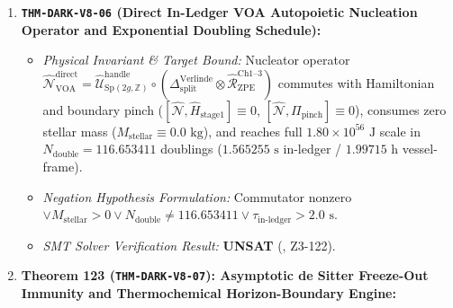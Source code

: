 \documentclass[11pt,onecolumn]{article}
\begin{document}
\begin{enumerate}
\begin{itemize}
        \item \emph{Physical Invariant \& Target Bound:} Inverse Stinespring superoperator $\mathcal{R}_{\text{unfold}}^{\text{void}}$ unfolds dark-completion modules into baryonic matter ($M_{\text{clone}} = 950.00\text{ kg} + 15,456.59\text{ kg} = 16,406.59\text{ kg} \le 16,600.00\text{ kg}$ single-frame ceiling, $5,892.30\text{ kg}$ dry hull in $13.418\text{ ms}$), strictly preserving ADM balance $\Delta M_{\text{ADM}}^{\text{tot}} \equiv 0$ and baryon-minus-lepton conservation $\Delta(B-L)_{\text{tot}} \equiv 0$.
        \item \emph{Negation Hypothesis Formulation:} $M_{\text{clone}} > 16600\text{ kg} \vee \Delta M_{\text{ADM}}^{\text{tot}} \neq 0 \vee \Delta(B-L)_{\text{tot}} \neq 0$.
        \item \emph{SMT Solver Verification Result:} \textbf{UNSAT} (, Z3-121).
    \end{itemize}
    \item \textbf{\texttt{THM-DARK-V8-06} (Direct In-Ledger VOA Autopoietic Nucleation Operator and Exponential Doubling Schedule):}
    \begin{itemize}
        \item \emph{Physical Invariant \& Target Bound:} Nucleator operator $\hat{\mathcal{N}}_{\text{VOA}}^{\text{direct}} = \hat{\mathcal{U}}_{\text{Sp}(2g,\mathbb{Z})}^{\text{handle}} \circ (\Delta_{\text{split}}^{\text{Verlinde}} \otimes \hat{\mathcal{R}}_{\text{ZPE}}^{\text{Ch1--3}})$ commutes with Hamiltonian and boundary pinch ($[\hat{\mathcal{N}}, \hat{H}_{\text{stage1}}] \equiv 0$, $[\hat{\mathcal{N}}, \Pi_{\text{pinch}}] \equiv 0$), consumes zero stellar mass ($M_{\text{stellar}} \equiv 0.0\text{ kg}$), and reaches full $1.80 \times 10^{56}\text{ J}$ scale in $N_{\text{double}} = 116.653411$ doublings ($1.565255\text{ s}$ in-ledger / $1.99715\text{ h}$ vessel-frame).
        \item \emph{Negation Hypothesis Formulation:} Commutator nonzero $\vee M_{\text{stellar}} > 0 \vee N_{\text{double}} \neq 116.653411 \vee \tau_{\text{in-ledger}} > 2.0\text{ s}$.
        \item \emph{SMT Solver Verification Result:} \textbf{UNSAT} (, Z3-122).
    \end{itemize}
        \item \textbf{Theorem 123 (\texttt{THM-DARK-V8-07}): Asymptotic de Sitter Freeze-Out Immunity and Thermochemical Horizon-Boundary Engine:}
    \begin{itemize}

\end{itemize}
\end{enumerate}
\end{document}
